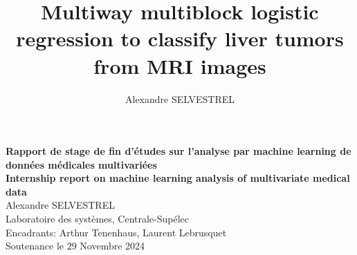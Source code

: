 \documentclass[preprint,12pt]{elsarticle}
\begin{document}
\title{Multiway multiblock logistic regression to classify liver tumors from MRI images} %


\author{Alexandre SELVESTREL} %


            \begin{center}
              \vspace*{2cm}
              {\LARGE \textbf{Rapport de stage de fin d'études sur l'analyse par machine learning de données médicales multivariées}} \\[7em]
              {\LARGE \textbf{Internship report on machine learning analysis of multivariate medical data}}\\[5em]
              {\large Alexandre SELVESTREL}\\[1em]
              {\large Laboratoire des systèmes, Centrale-Supélec}\\[1em]
              {\large Encadrants: Arthur Tenenhaus, Laurent Lebrusquet}\\
              \vspace*{\fill}
              Soutenance le 29 Novembre 2024
          \end{center}
\end{document}
